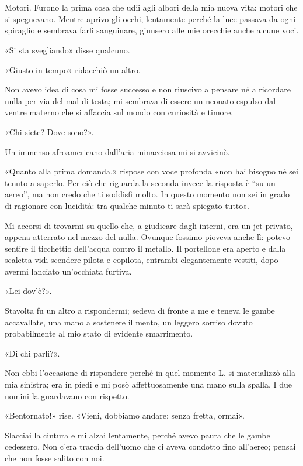 \chapter{}
\label{ch:3}

Motori. Furono la prima cosa che udii agli albori della mia nuova vita: motori che si spegnevano.
Mentre aprivo gli occhi, lentamente perché la luce passava da ogni spiraglio e sembrava farli
sanguinare, giunsero alle mie orecchie anche alcune voci.

«Si sta svegliando» disse qualcuno.

«Giusto in tempo» ridacchiò un altro.

Non avevo idea di cosa mi fosse successo e non riuscivo a pensare né a ricordare nulla per via del
mal di testa; mi sembrava di essere un neonato espulso dal ventre materno che si affaccia sul mondo
con curiosità e timore.

«Chi siete? Dove sono?».

Un immenso afroamericano dall'aria minacciosa mi si avvicinò.

«Quanto alla prima domanda,» rispose con voce profonda «non hai bisogno né sei tenuto a saperlo. Per
ciò che riguarda la seconda invece la risposta è ``su un aereo'', ma non credo che ti soddisfi
molto. In questo momento non sei in grado di ragionare con lucidità: tra qualche minuto ti sarà
spiegato tutto».

Mi accorsi di trovarmi su quello che, a giudicare dagli interni, era un jet privato, appena
atterrato nel mezzo del nulla. Ovunque fossimo pioveva anche lì: potevo sentire il ticchettio
dell'acqua contro il metallo. Il portellone era aperto e dalla scaletta vidi scendere pilota e
copilota, entrambi elegantemente vestiti, dopo avermi lanciato un'occhiata furtiva.

«Lei dov'è?».

Stavolta fu un altro a rispondermi; sedeva di fronte a me e teneva le gambe accavallate, una mano a
sostenere il mento, un leggero sorriso dovuto probabilmente al mio stato di evidente smarrimento.

«Di chi parli?».

Non ebbi l'occasione di rispondere perché in quel momento L. si materializzò alla mia sinistra; era
in piedi e mi posò affettuosamente una mano sulla spalla. I due uomini la guardavano con rispetto.

«Bentornato!» rise. «Vieni, dobbiamo andare; senza fretta, ormai».

Slacciai la cintura e mi alzai lentamente, perché avevo paura che le gambe cedessero. Non c'era
traccia dell'uomo che ci aveva condotto fino all'aereo; pensai che non fosse salito con noi.


